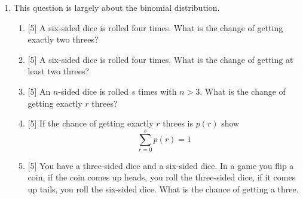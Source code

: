 \documentclass{article}
\newif\ifanswer
\begin{document}
\begin{enumerate}

\item This question is largely about the binomial distribution.
  \begin{enumerate}
  \item{} [5] A six-sided dice is rolled four times. What is the change of getting exactly two threes?
      \item{} [5] A six-sided dice is rolled four times. What is the change of getting at least two threes?
    \item{} [5] An $n$-sided dice is rolled $s$ times with $n>3$. What is the change of getting exactly $r$ threes?
    \item{} [5] If the chance of getting exactly $r$ threes is $p(r)$ show
      $$\sum_{r=0}^sp(r)=1$$
    \item{} [5] You have a three-sided dice and a six-sided dice. In a game
      you flip a coin, if the coin comes up heads, you roll the
      three-sided dice, if it comes up tails, you roll the six-sided
      dice. What is the chance of getting a three.
      \end{enumerate}

\ifanswer
If a six sided dice if rolled four times then the probability of exactly two threes is
\begin{equation}
  p(2)=\left(\begin{array}{c}4\\2\end{array}\right)\left(\frac{1}{6}\right)^2\left(\frac{5}{6}\right)^2
\end{equation}
The chance of at least two threes is the same as the chance of anything except zero threes or one three:
\begin{equation}
  p(\ge 2)=1-\left(\frac{5}{6}\right)^4-4\left(\frac{1}{6}\right)\left(\frac{5}{6}\right)
\end{equation}
The more general case is
\begin{equation}
  p(r)=\left(\begin{array}{c}s\\r\end{array}\right)\left(\frac{1}{6}\right)^r\left(\frac{5}{6}\right)^{s-r}
\end{equation}
The sum of $p(r)$ is one follows from the binomial theorem
\begin{equation}
  (p+q)^s=\sum_{r=0}^s\left(\begin{array}{c}s\\r\end{array}\right)p^rq^{s-r}
\end{equation}
but with $q=1-p$. Finally the probability of getting a three in the coin flipping game is
\begin{equation}
  p=\frac{1}{2}\frac{1}{6}+\frac{1}{2}\frac{1}{3}
\end{equation}
\fi


\end{enumerate}
\end{document}
